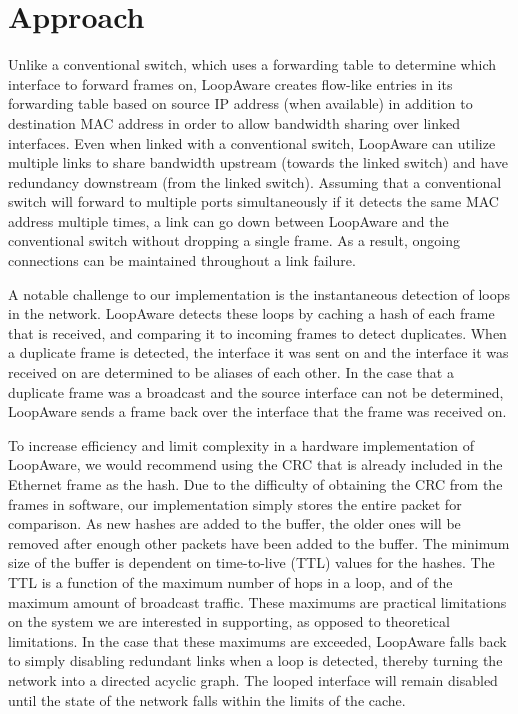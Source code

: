 \section{Approach}
\label{sec:approach}
    Unlike a conventional switch, which uses a forwarding table to determine which interface to forward frames on, LoopAware creates flow-like entries in its forwarding table based on source IP address (when available) in addition to destination MAC address in order to allow bandwidth sharing over linked interfaces.
    Even when linked with a conventional switch, LoopAware can utilize multiple links to share bandwidth upstream (towards the linked switch) and have redundancy downstream (from the linked switch).
    Assuming that a conventional switch will forward to multiple ports simultaneously if it detects the same MAC address multiple times, a link can go down between LoopAware and the conventional switch without dropping a single frame.
    As a result, ongoing connections can be maintained throughout a link failure.

    A notable challenge to our implementation is the instantaneous detection of loops in the network.
    LoopAware detects these loops by caching a hash of each frame that is received, and comparing it to incoming frames to detect duplicates.
    When a duplicate frame is detected, the interface it was sent on and the interface it was received on are determined to be aliases of each other.
    In the case that a duplicate frame was a broadcast and the source interface can not be determined, LoopAware sends a frame back over the interface that the frame was received on.
    
    To increase efficiency and limit complexity in a hardware implementation of LoopAware, we would recommend using the CRC that is already included in the Ethernet frame as the hash.
    Due to the difficulty of obtaining the CRC from the frames in software, our implementation simply stores the entire packet for comparison.
    As new hashes are added to the buffer, the older ones will be removed after enough other packets have been added to the buffer.
    The minimum size of the buffer is dependent on time-to-live (TTL) values for the hashes.
    The TTL is a function of the maximum number of hops in a loop, and of the maximum amount of broadcast traffic.
    These maximums are practical limitations on the system we are interested in supporting, as opposed to theoretical limitations.
    In the case that these maximums are exceeded, LoopAware falls back to simply disabling redundant links when a loop is detected, thereby turning the network into a directed acyclic graph.
    The looped interface will remain disabled until the state of the network falls within the limits of the cache.
    
